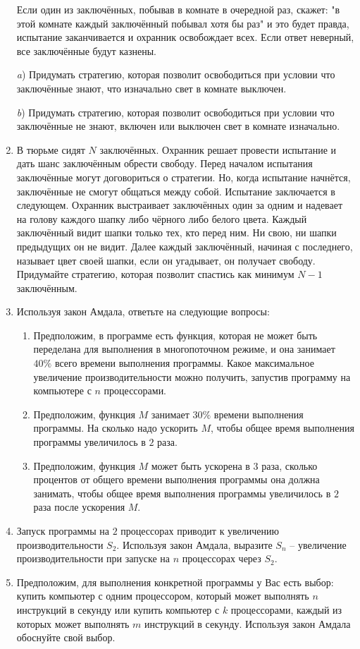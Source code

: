 \begin{enumerate}
Если один из заключённых, побывав в комнате в очередной раз, скажет:
"в этой комнате каждый заключённый побывал хотя бы раз" и это будет правда,
испытание заканчивается и охранник освобождает всех. Если ответ неверный,
все заключённые будут казнены.

\textit{a}) Придумать стратегию, которая позволит освободиться при условии что
заключённые знают, что изначально свет в комнате выключен.

\textit{b}) Придумать стратегию, которая позволит освободиться при условии что
заключённые не знают, включен или выключен свет в комнате изначально.

\item
В тюрьме сидят $N$ заключённых. Охранник решает провести испытание и дать шанс
заключённым обрести свободу. Перед началом испытания заключённые могут
договориться о стратегии. Но, когда испытание начнётся, заключённые не смогут
общаться между собой. Испытание заключается в следующем. Охранник выстраивает
заключённых один за одним и надевает на голову каждого шапку либо чёрного либо
белого цвета. Каждый заключённый видит шапки только тех, кто перед ним. Ни свою,
ни шапки предыдущих он не видит. Далее каждый заключённый, начиная с последнего,
называет цвет своей шапки, если он угадывает, он получает свободу. Придумайте
стратегию, которая позволит спастись как минимум $N-1$ заключённым.

\item
Используя закон Амдала, ответьте на следующие вопросы:
\begin{enumerate}
    \item Предположим, в программе есть функция, которая не может быть переделана
    для выполнения в многопоточном режиме, и она занимает $40\%$ всего времени
    выполнения программы. Какое максимальное увеличение производительности можно
    получить, запустив программу на компьютере с $n$ процессорами.
    \item Предположим, функция $M$ занимает $30\%$ времени выполнения программы.
    На сколько надо ускорить $M$, чтобы общее время выполнения программы
    увеличилось в $2$ раза.
    \item Предположим, функция $M$ может быть ускорена в 3 раза, сколько
    процентов от общего времени выполнения программы она должна занимать, чтобы
    общее время выполнения программы увеличилось в $2$ раза после ускорения $M$.
\end{enumerate}

\item
Запуск программы на $2$ процессорах приводит к увеличению производительности
$S_2$. Используя закон Амдала, выразите $S_n$ -- увеличение производительности
при запуске на $n$ процессорах через $S_2$.

\item
Предположим, для выполнения конкретной программы у Вас есть выбор: купить
компьютер с одним процессором, который может выполнять $n$ инструкций в секунду
или купить компьютер с $k$ процессорами, каждый из которых может выполнять $m$
инструкций в секунду. Используя закон Амдала обоснуйте свой выбор.

\end{enumerate}